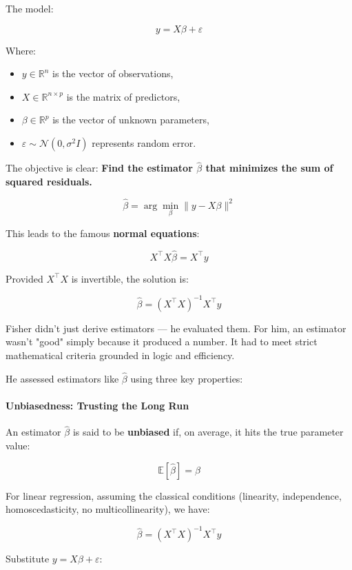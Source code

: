 \medskip

The model:

\[
y = X\beta + \varepsilon
\]

Where:
\begin{itemize}
    \item \( y \in \mathbb{R}^n \) is the vector of observations,
    \item \( X \in \mathbb{R}^{n \times p} \) is the matrix of predictors,
    \item \( \beta \in \mathbb{R}^p \) is the vector of unknown parameters,
    \item \( \varepsilon \sim \mathcal{N}(0, \sigma^2 I) \) represents random error.
\end{itemize}

The objective is clear:  
\textbf{Find the estimator \( \hat{\beta} \) that minimizes the sum of squared residuals.}

\[
\hat{\beta} = \arg\min_{\beta} \| y - X\beta \|^2
\]

This leads to the famous \textbf{normal equations}:

\[
X^\top X \hat{\beta} = X^\top y
\]

Provided \( X^\top X \) is invertible, the solution is:

\[
\hat{\beta} = (X^\top X)^{-1} X^\top y
\]

Fisher didn’t just derive estimators — he evaluated them. For him, an estimator wasn’t "good" simply because it produced a number. It had to meet strict mathematical criteria grounded in logic and efficiency. 

He assessed estimators like \( \hat{\beta} \) using three key properties:

\medskip

\paragraph{\textbf{Unbiasedness: Trusting the Long Run}}

An estimator \( \hat{\beta} \) is said to be \textbf{unbiased} if, on average, it hits the true parameter value:

\[
\mathbb{E}[\hat{\beta}] = \beta
\]

For linear regression, assuming the classical conditions (linearity, independence, homoscedasticity, no multicollinearity), we have:

\[
\hat{\beta} = (X^\top X)^{-1} X^\top y
\]

Substitute \( y = X\beta + \varepsilon \):

